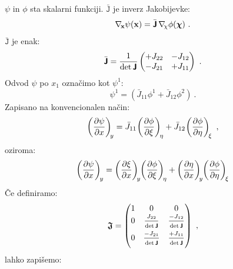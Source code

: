 $\psi$ in $\phi$ sta skalarni funkciji. $\bar{\texttt{J}}$ je inverz Jakobijevke:
\begin{equation}
   \mathbf{\nabla_{\mkern-3mu x}} \psi(\mathbf{x}) = \bar{\bm{\mathsf{J}}} \mkern3mu \mathbf{\nabla_{\mkern-4mu \chi}} \phi(\bm{\chi}) \ .
\end{equation}
$\bar{\texttt{J}}$ je enak:
\begin{equation}
   \bar{\bm{\mathsf{J}}}
   =
   \frac{1}{\det \bm{\mathsf{J}}}
   \begin{pmatrix}
      +J_{22} & -J_{12} \\
      -J_{21} & +J_{11}
   \end{pmatrix}
   \ .
\end{equation}
Odvod $\psi$ po $x_1$ označimo kot $\psi^1$:
\begin{equation}
   \psi^1 = \left(\bar{J}_{11} \phi^1 + \bar{J}_{12} \phi^2 \right) \ .
\end{equation}
Zapisano na konvencionalen način:
\begin{equation}
   \left(\frac{\partial \psi}{\partial x}\right)_{\mkern-4mu y}
   =
   \bar{J}_{11} \mkern-2mu \left(\frac{\partial \phi}{\partial \xi}\right)_{\mkern-3mu \eta}
   +
   \bar{J}_{12} \mkern-2mu \left(\frac{\partial \phi}{\partial \eta}\right)_{\mkern-3mu \xi} \ ,
\end{equation}
oziroma:
\begin{equation}
   \left(\frac{\partial \psi}{\partial x} \right)_{\mkern-3mu y}
   =
   \left(\frac{\partial \xi}{\partial x} \right)_{\mkern-4mu y}
   \mkern-4mu \left(\frac{\partial \phi}{\partial \xi}\right)_{\mkern-3mu \eta}
   +
   \left(\frac{\partial \eta}{\partial x}\right)_{\mkern-4mu y}
   \mkern-4mu \left(\frac{\partial \phi}{\partial \eta}\right)_{\mkern-3mu \xi}
\end{equation}
Če definiramo:
\begin{equation}
   \mathbsf{\mathfrak{J}}
   =
   \begin{pmatrix}
      1   &    0                                &    0                                 \\
      0   &   \frac{J_{22} \rule[-1mm]{0mm}{2.9mm}}{\det \mathbsf{J} \rule[-1.4mm]{0mm}{4mm}}   &   \frac{-J_{12} \rule[-1mm]{0mm}{2.9mm}}{\det \mathbsf{J} \rule[-1.4mm]{0mm}{4mm}}   \\
      0   &   \frac{-J_{21} \rule[-1mm]{0mm}{2.9mm}}{\det \mathbsf{J} \rule[-1.4mm]{0mm}{4mm}}  &   \frac{+J_{11} \rule[-1mm]{0mm}{2.9mm}}{\det \mathbsf{J} \rule[-1.4mm]{0mm}{4mm}}
   \end{pmatrix} \ ,
\end{equation}
lahko zapišemo:
